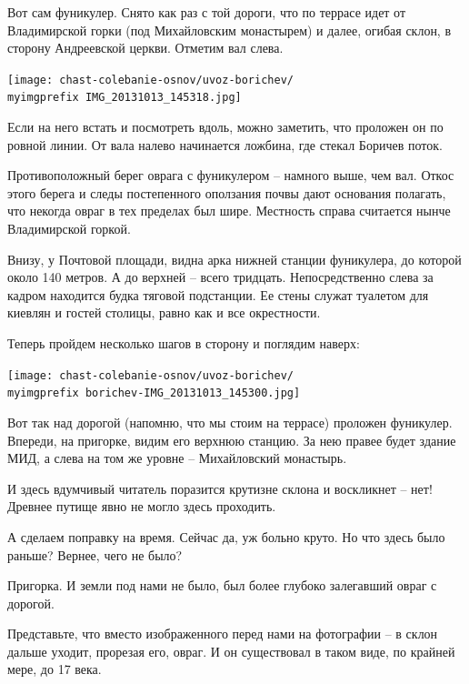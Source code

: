 \newpage

Вот сам фуникулер. Снято как раз с той дороги, что по террасе идет от Владимирской горки (под Михайловским монастырем) и далее, огибая склон, в сторону Андреевской церкви. Отметим вал слева. 
\vspace*{\fill}
\begin{center}
\texttt{[image: chast-colebanie-osnov/uvoz-borichev/\\myimgprefix IMG\_20131013\_145318.jpg]}
\end{center}
\vspace*{\fill}
Если на него встать и посмотреть вдоль, можно заметить, что проложен он по ровной линии. От вала налево начинается ложбина, где стекал Боричев поток.

Противоположный берег оврага с фуникулером – намного выше, чем вал. Откос этого берега и следы постепенного оползания почвы дают основания полагать, что некогда овраг в тех пределах был шире. Местность справа считается нынче Владимирской горкой.

Внизу, у Почтовой площади, видна арка нижней станции фуникулера, до которой около 140 метров. А до верхней – всего тридцать. Непосредственно слева за кадром находится будка тяговой подстанции. Ее стены служат туалетом для киевлян и гостей столицы, равно как и все окрестности.

\newpage

Теперь пройдем несколько шагов в сторону и поглядим наверх:

\begin{center}
\texttt{[image: chast-colebanie-osnov/uvoz-borichev/\\myimgprefix borichev-IMG\_20131013\_145300.jpg]}
\end{center}

Вот так над дорогой (напомню, что мы стоим на террасе) проложен фуникулер. Впереди, на пригорке, видим его верхнюю станцию. За нею правее будет здание МИД, а слева на том же уровне – Михайловский монастырь.

И здесь вдумчивый читатель поразится крутизне склона и воскликнет – нет! Древнее путище явно не могло здесь проходить.

А сделаем поправку на время. Сейчас да, уж больно круто. Но что здесь было раньше? Вернее, чего не было?

Пригорка. И земли под нами не было, был более глубоко залегавший овраг с дорогой.

Представьте, что вместо изображенного перед нами на фотографии –  в склон дальше уходит, прорезая его, овраг. И он существовал в таком виде, по крайней мере, до 17 века.

